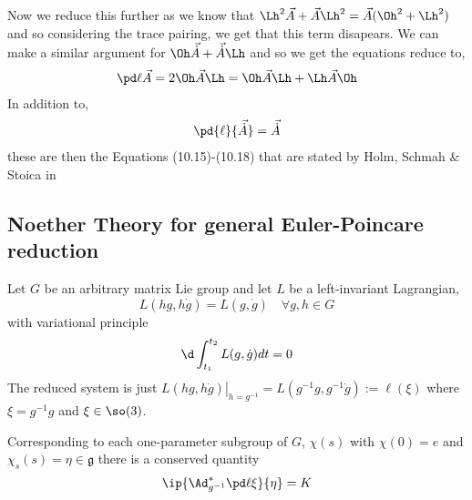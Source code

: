 Now we reduce this further as we know that $\Lh^2\vec A + \vec A\Lh^2 = \vec A(\Oh^2 + \Lh^2)$ and so considering the trace pairing, we get that this term disapears. We can make a similar argument for $\Oh\vec{\dot A} + \vec{\dot A}\Lh$ and so we get the equations reduce to,
\begin{align}
  \pd \ell {\vec A} = 2\Oh \vec A\Lh = \Oh\vec A\Lh + \Lh\vec A\Oh
\end{align}
In addition to,
\begin{align}
  \pd{\ell}{\vec{\dot A}} = \vec{\dot A}
\end{align}
these are then the Equations (10.15)-(10.18) that are stated by Holm, Schmah \& Stoica in \cite{holm_schmah_stoica_2009}
\subsection{Noether Theory for general Euler-Poincare reduction}
Let $G$ be an arbitrary matrix Lie group and let $L$ be a left-invariant Lagrangian,
$$ L(hg, h\dot g) = L(g, \dot g) \quad \forall g, h \in G$$
with variational principle
$$ \d \int_{t_1}^{t_2} L(g, \dot g)dt = 0 $$
The reduced system is just $\left.L(hg, h\dot g)\right|_{h = g^{-1}} = L(g^{-1}g, g^{-1}\dot g) := \ell(\xi)$ where $\xi = g^{-1}g$ and $\xi \in \so(3)$.
\begin{nthm}
  Corresponding to each one-parameter subgroup of $G$, $\chi(s)$ with $\chi(0) = e$ and $\chi_s (s) = \eta \in \mathfrak{g}$ there is a conserved quantity
  $$ \ip{\Ad^*_{g^{-1}} \pd \ell \xi}{\eta} = K $$
\end{nthm}
